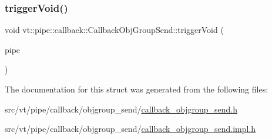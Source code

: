 \mbox{\label{structvt_1_1pipe_1_1callback_1_1_callback_obj_group_send_a9c15cb84991c601f50eede9d41ef811c}} 
\subsubsection{\texorpdfstring{trigger\+Void()}{triggerVoid()}}
{\footnotesize\ttfamily void vt\+::pipe\+::callback\+::\+Callback\+Obj\+Group\+Send\+::trigger\+Void (\begin{DoxyParamCaption}\item[{\hyperlink{namespacevt_ac9852acda74d1896f48f406cd72c7bd3}{Pipe\+Type} const \&}]{pipe }\end{DoxyParamCaption})\hspace{0.3cm}{\ttfamily [inline]}}



The documentation for this struct was generated from the following files\+:\begin{DoxyCompactItemize}
\item 
src/vt/pipe/callback/objgroup\+\_\+send/\hyperlink{callback__objgroup__send_8h}{callback\+\_\+objgroup\+\_\+send.\+h}\item 
src/vt/pipe/callback/objgroup\+\_\+send/\hyperlink{callback__objgroup__send_8impl_8h}{callback\+\_\+objgroup\+\_\+send.\+impl.\+h}\end{DoxyCompactItemize}

